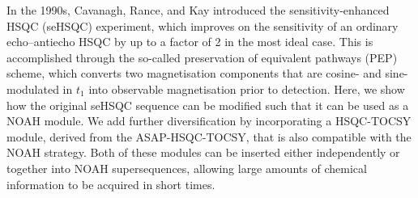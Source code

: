 \documentclass[11pt]{article}
\begin{document}
\begin{refsection}
In the 1990s, Cavanagh, Rance, and Kay introduced the sensitivity-enhanced HSQC (seHSQC) experiment,\autocite{sehsqc} which improves on the sensitivity of an ordinary echo--antiecho HSQC by up to a factor of 2 in the most ideal case.
This is accomplished through the so-called preservation of equivalent pathways (PEP) scheme, which converts two magnetisation components that are cosine- and sine-modulated in $t_1$ into observable magnetisation prior to detection.\autocite{pep}
Here, we show how the original seHSQC sequence can be modified such that it can be used as a NOAH module.
We add further diversification by incorporating a HSQC-TOCSY module, derived from the ASAP-HSQC-TOCSY,\autocite{Becker2019JMR} that is also compatible with the NOAH strategy.
Both of these modules can be inserted either independently or together into NOAH supersequences, allowing large amounts of chemical information to be acquired in short times.



\end{refsection}
\end{document}
